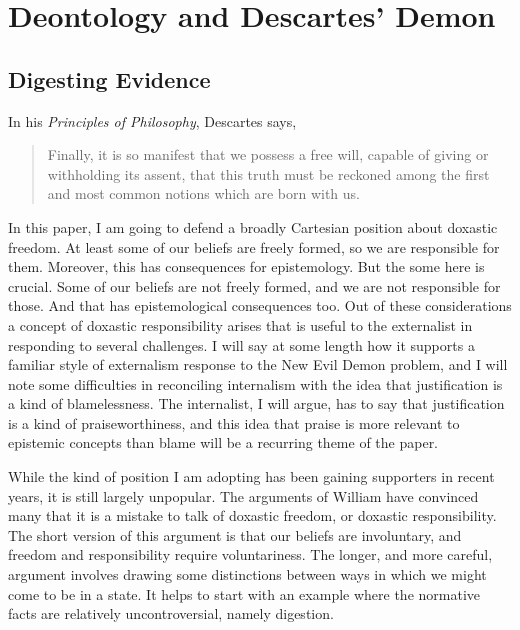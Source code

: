 %
%
%
%
%
%
%
%
%
%
\chapter{Deontology and Descartes' Demon}



\section{Digesting Evidence} 

In his \textit{Principles of Philosophy}, Descartes says,

\begin{quote}
Finally, it is so manifest that we possess a free will, capable of giving or withholding its assent, that this truth must be reckoned among the first and most common notions which are born with us. \cite[paragraph xxxix]{DescartesPrinciples}
\end{quote}

\noindent In this paper, I am going to defend a broadly Cartesian position about doxastic freedom. At least some of our beliefs are freely formed, so we are responsible for them. Moreover, this has consequences for epistemology. But the some here is crucial. Some of our beliefs are not freely formed, and we are not responsible for those. And that has epistemological consequences too. Out of these considerations a concept of doxastic responsibility arises that is useful to the externalist in responding to several challenges. I will say at some length how it supports a familiar style of externalism response to the New Evil Demon problem, and I will note some difficulties in reconciling internalism with the idea that justification is a kind of blamelessness. The internalist, I will argue, has to say that justification is a kind of praiseworthiness, and this idea that praise is more relevant to epistemic concepts than blame will be a recurring theme of the paper.

While the kind of position I am adopting has been gaining supporters in recent years, it is still largely unpopular. The arguments of William \citet{Alston1988} have convinced many that it is a mistake to talk of doxastic freedom, or doxastic responsibility. The short version of this argument is that our beliefs are involuntary, and freedom and responsibility require voluntariness. The longer, and more careful, argument involves drawing some distinctions between ways in which we might come to be in a state. It helps to start with an example where the normative facts are relatively uncontroversial, namely digestion.


